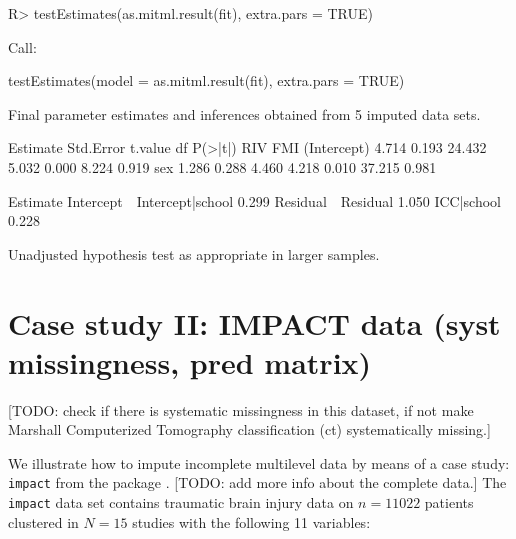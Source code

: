 \documentclass[
]{jss}
\begin{document}
\begin{CodeChunk}
\begin{CodeInput}
R> testEstimates(as.mitml.result(fit), extra.pars = TRUE)
\end{CodeInput}
\begin{CodeOutput}

Call:

testEstimates(model = as.mitml.result(fit), extra.pars = TRUE)

Final parameter estimates and inferences obtained from 5 imputed data sets.

             Estimate Std.Error   t.value        df   P(>|t|)       RIV       FMI 
(Intercept)     4.714     0.193    24.432     5.032     0.000     8.224     0.919 
sex             1.286     0.288     4.460     4.218     0.010    37.215     0.981 

                            Estimate 
Intercept~~Intercept|school    0.299 
Residual~~Residual             1.050 
ICC|school                     0.228 

Unadjusted hypothesis test as appropriate in larger samples.
\end{CodeOutput}
\end{CodeChunk}

\hypertarget{case-study-ii-impact-data-syst-missingness-pred-matrix}{%
\section{Case study II: IMPACT data (syst missingness, pred
matrix)}\label{case-study-ii-impact-data-syst-missingness-pred-matrix}}

{[}TODO: check if there is systematic missingness in this dataset, if
not make Marshall Computerized Tomography classification (ct)
systematically missing.{]}

We illustrate how to impute incomplete multilevel data by means of a
case study: \texttt{impact} from the  package
\citep[empirical data on traumatic brain injuries, \(n = 11,022\) units
across \(N = 15\) clusters,][]{metamisc}. {[}TODO: add more info about
the complete data.{]} The \texttt{impact} data set contains traumatic
brain injury data on \(n = 11022\) patients clustered in \(N = 15\)
studies with the following 11 variables:
\end{document}
